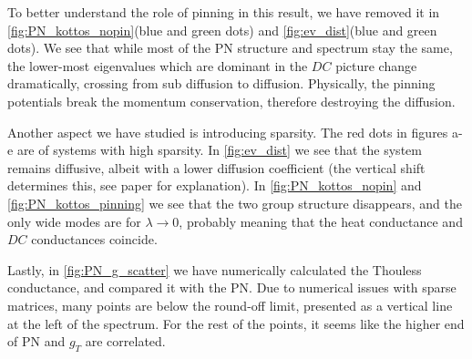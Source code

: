 To better understand the role of pinning in this result, we have
removed it in \autoref{fig:PN_kottos_nopin}(blue and green dots) and 
\autoref{fig:ev_dist}(blue and green dots). We see that 
while most of the PN structure and spectrum stay the same, the lower-most eigenvalues
which are dominant in the $DC$ picture change dramatically, crossing from sub diffusion
to diffusion. Physically, the pinning potentials break the momentum conservation,
therefore destroying the diffusion.



Another aspect we have studied is introducing sparsity. The red dots in figures a-e 
are of systems with high sparsity. In \autoref{fig:ev_dist} we see that the 
system remains diffusive, albeit with a lower diffusion coefficient (the vertical
shift determines this, see paper
for explanation). In  \autoref{fig:PN_kottos_nopin} and \autoref{fig:PN_kottos_pinning}
we see that the two group structure disappears, and the only wide modes
are for $\lambda\rightarrow 0$, probably meaning that the heat conductance 
and $DC$ conductances coincide.


Lastly, in \autoref{fig:PN_g_scatter} we have
numerically calculated the Thouless conductance,
and compared it with the PN. Due to numerical issues
with sparse matrices, many points are below the round-off limit,
presented as a vertical line at the left of the spectrum. For the rest
of the points, it seems like the higher end of PN and $g_T$ are correlated.



